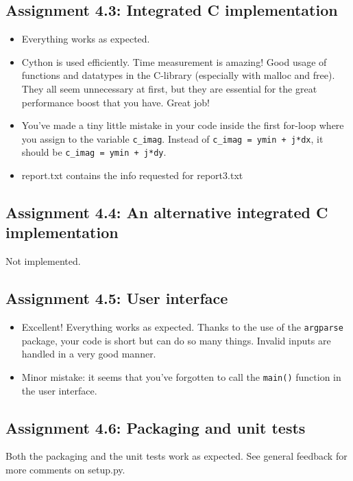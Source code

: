 \documentclass[a4paper]{article}
\begin{document}
\subsection*{Assignment 4.3: Integrated C implementation}
\begin{itemize}
  \item Everything works as expected.
  \item Cython is used efficiently. Time measurement is amazing! Good usage of functions and datatypes in the C-library (especially with malloc and free). They all seem unnecessary at first, but they are essential for the great performance boost that you have. Great job!
  \item You've made a tiny little mistake in your code inside the first for-loop where you assign to the variable \texttt{c_imag}. Instead of \texttt{c_imag = ymin + j*dx}, it should be \texttt{c_imag = ymin + j*dy}.
  \item report.txt contains the info requested for report3.txt
\end{itemize}

\subsection*{Assignment 4.4:  An alternative integrated C implementation}
Not implemented.

\subsection*{Assignment 4.5: User interface}
\begin{itemize}
  \item Excellent! Everything works as expected. Thanks to the use of the \texttt{argparse} package, your code is short but can do so many things. Invalid inputs are handled in a very good manner. 
  \item Minor mistake: it seems that you've forgotten to call the \texttt{main()} function in the user interface.
\end{itemize}

\subsection*{Assignment 4.6:  Packaging and unit tests}
Both the packaging and the unit tests work as expected. See general feedback for more comments on setup.py.
\end{document}
